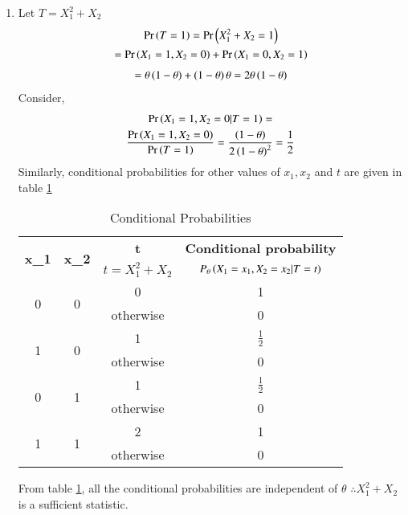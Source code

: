 \documentclass[journal,12pt,twocolumn]{IEEEtran}
\begin{document}
\begin{enumerate}
    \item Let $T=X_1^2+X_2$\\
    \begin{multline}
        \Pr\left(T=1\right)=\Pr\left(X_1^2+X_2=1\right)\\=\Pr\left(X_1=1,X_2=0\right)+\Pr\left(X_1=0,X_2=1\right)
    \end{multline}
     \begin{align}
        =\theta \left(1-\theta\right) + \left(1-\theta\right)\theta  = 2\theta \left(1-\theta\right)
    \end{align}
    Consider,
    \begin{multline}
        \Pr\left(X_1=1,X_2=0 | T=1\right) = \\\frac{\Pr\left(X_1=1,X_2=0\right)}{\Pr\left(T=1\right)}
        =\frac{\left(1-\theta\right)}{2\left(1-\theta\right)^2}=\frac{1}{2}
    \end{multline}
    Similarly, conditional probabilities for other values of $x_1,x_2$ and $t$ are given in table \ref{table3}
    
    \begin{center}
    \begin{table}[H]
    \begin{tabular}[width=\columnwidth]{|c|c|c|c|}
         \hline
        \multirow{2}{*}{\textbf{x_1}} & \multirow{2}{*}{\textbf{x_2}} & \textbf{t} & \textbf{Conditional probability}  \\
        & & $t=X_1^2+X_2$ & $P_\theta\left(X_1=x_1,X_2=x_2|T=t\right)$\\
        \hline
        \multirow{2}{*}{0} & \multirow{2}{*}{0} & 0 & 1\\ 
        & & otherwise & 0 \\ 
        \hline
        \multirow{2}{*}{1} & \multirow{2}{*}{0} & 1 & $\frac{1}{2}$\\ 
        & & otherwise & 0 \\ 
        \hline
        \multirow{2}{*}{0} & \multirow{2}{*}{1} & 1 & $\frac{1}{2}$\\ 
        & & otherwise & 0 \\ 
        \hline
        \multirow{2}{*}{1} & \multirow{2}{*}{1} & 2 & 1\\ 
        & & otherwise & 0 \\        
        \hline
    \end{tabular}
    \caption{Conditional Probabilities}
    \label{table3}
    \end{table}  
    \end{center}
    From table \ref{table3}, all the conditional probabilities are independent of $\theta$ $\therefore X_1^2+X_2$ is a sufficient statistic.
    
\end{enumerate}
\end{document}
